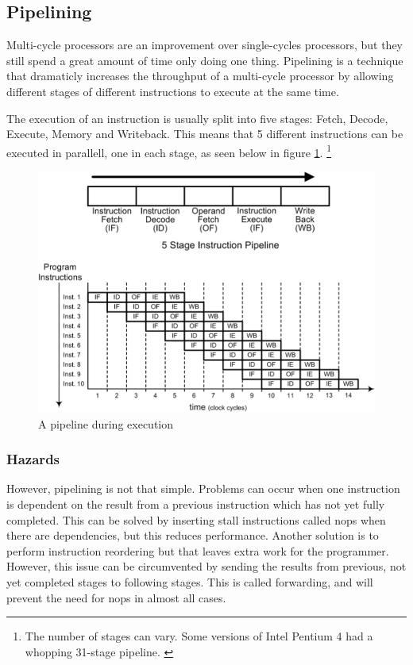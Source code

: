 \subsection{Pipelining}

Multi-cycle processors are an improvement over single-cycles processors, but they still spend a great amount of time only doing one thing.
Pipelining is a technique that dramaticly increases the throughput of a multi-cycle processor by allowing different stages of different instructions to execute at the same time.

The execution of an instruction is usually split into five stages:
Fetch, Decode, Execute, Memory and Writeback. 
This means that 5 different instructions can be executed in parallell,
one in each stage, as seen below in figure \ref{fig:pipeline}.
\footnote{
    The number of stages can vary.
    Some versions of Intel Pentium 4 had a whopping 31-stage pipeline.
    \cite{wiki-pentium4}
}

\begin{figure}[ht]
    \centering
    \includegraphics[width=\textwidth]{figures/pipeline2.png}
    \caption{A pipeline during execution} 
    \label{fig:pipeline}
\end{figure}

\subsubsection*{Hazards}
However, pipelining is not that simple. Problems can occur when one instruction
is dependent on the result from a previous instruction which has not yet fully completed.
This can be solved by inserting stall instructions called nops when there are dependencies,
but this reduces performance. Another solution is to perform instruction reordering
but that leaves extra work for the programmer.
However, this issue can be circumvented by sending the results from previous, not
yet completed stages to following stages.
This is called forwarding, and will prevent the need for nops in almost all cases.
\cite{hazards-lecture}

